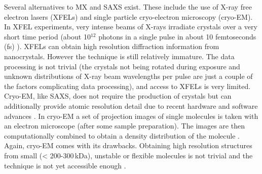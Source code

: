     Several alternatives to MX and SAXS exist.
    These include the use of X-ray free electron lasers (XFELs) and single particle cryo-electron microscopy (cryo-EM).
    In XFEL experiments, very intense beams of X-rays irradiate crystals over a very short time period (about 10$^{\text{12}}$ photons in a single pulse in about 10 femtoseconds (fs) \cite{chapman2011femtosecond}). XFELs can obtain high resolution diffraction information from nanocrystals.
    However the technique is still relatively immature.
    The data processing is not trivial (the crystals not being rotated during exposure and unknown distributions of X-ray beam wavelengths per pulse are just a couple of the factors complicating data processing), and access to XFELs is very limited.
    Cryo-EM, like SAXS, does not require the production of crystals but can additionally provide atomic resolution detail due to recent hardware and software advances \cite{bai2015cryo}.
    In cryo-EM a set of projection images of single molecules is taken with an electron microscope (after some sample preparation).
    The images are then computationally combined to obtain a density distribution of the molecule \cite{milne2013cryo}.
    Again, cryo-EM comes with its drawbacks. Obtaining high resolution structures from small (< 200-300$\,$kDa), unstable or flexible molecules is not trivial and the technique is not yet accessible enough \cite{bai2015cryo}.
